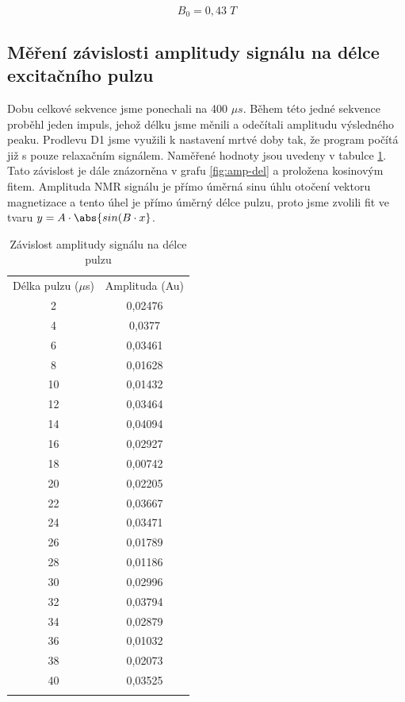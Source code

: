 \begin{equation}
    B_0 = 0,43 \; T
\end{equation}

\subsection{Měření závislosti amplitudy signálu na délce excitačního pulzu}
Dobu celkové sekvence jsme ponechali na 400 $\mu s$. Během této jedné sekvence proběhl jeden impuls, jehož délku jsme měnili a odečítali amplitudu výsledného peaku. Prodlevu D1 jsme využili k nastavení mrtvé doby tak, že program počítá již s pouze relaxačním signálem. Naměřené hodnoty jsou uvedeny v tabulce \ref{tab:puls_amplituda}. Tato závislost je dále znázorněna v grafu \ref{fig:amp-del} a proložena kosinovým fitem. Amplituda NMR signálu je přímo úměrná sinu úhlu otočení vektoru magnetizace a tento úhel je přímo úměrný délce pulzu, proto jsme zvolili fit ve tvaru $y = A \cdot \abs{sin(B \cdot x}$.

\begin{table}[!h]
\centering
\caption{Závislost amplitudy signálu na délce pulzu}
\label{tab:puls_amplituda}
\begin{tabular}{c c}
\hline\noalign{\smallskip}
Délka pulzu ($\mu$s) & Amplituda (Au) \\
\noalign{\smallskip}\hline\noalign{\smallskip}
2 & 0,02476 \\
4 & 0,0377 \\
6 & 0,03461 \\
8 & 0,01628 \\
10 & 0,01432 \\
12 & 0,03464 \\
14 & 0,04094 \\
16 & 0,02927 \\
18 & 0,00742 \\
20 & 0,02205 \\
22 & 0,03667 \\
24 & 0,03471 \\
26 & 0,01789 \\
28 & 0,01186 \\
30 & 0,02996 \\
32 & 0,03794 \\
34 & 0,02879 \\
36 & 0,01032 \\
38 & 0,02073 \\
40 & 0,03525 \\
\noalign{\smallskip}\hline
\end{tabular}
\end{table}

